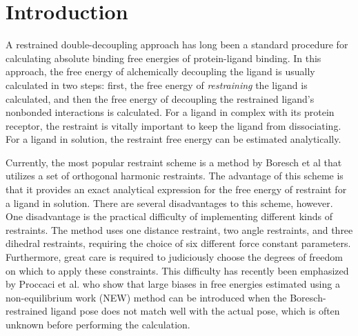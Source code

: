 \documentclass[%
 aip,
rsi,%
 amsmath,amssymb,
 reprint,%
]{revtex4-1}
\begin{document}
\maketitle


\section*{Introduction}

A restrained double-decoupling approach has long been a standard procedure for calculating absolute binding free energies of protein-ligand binding.  In this approach, the free energy of alchemically decoupling the ligand is usually calculated in two steps: first, the free energy of \textit{restraining} the ligand is calculated, and then the free energy of decoupling the restrained ligand's nonbonded interactions is calculated.     For a ligand in complex with its protein receptor, the restraint is vitally important to keep the ligand from dissociating.  For a ligand in solution, the restraint free energy can be estimated analytically. 

Currently, the most popular restraint scheme is a method by Boresch et al \cite{boresch2003absolute} that utilizes a set of orthogonal harmonic restraints.  The advantage of this scheme is that it provides an exact analytical expression for the free energy of restraint for a ligand in solution.    There are several disadvantages to this scheme, however.  One disadvantage is the practical difficulty of implementing different kinds of restraints.  The method uses one distance restraint, two angle restraints, and three dihedral restraints, requiring the choice of six different force constant parameters.  Furthermore, great care is required to judiciously choose the degrees of freedom on which to apply these constraints.  This difficulty has recently been emphasized by Proccaci et al. \cite{procacci2021ns} who show that large biases in free energies estimated using a non-equilibrium work (NEW) method can be introduced when the Boresch-restrained ligand pose does not match well with the actual pose, which is often unknown before performing the calculation.
\end{document}
